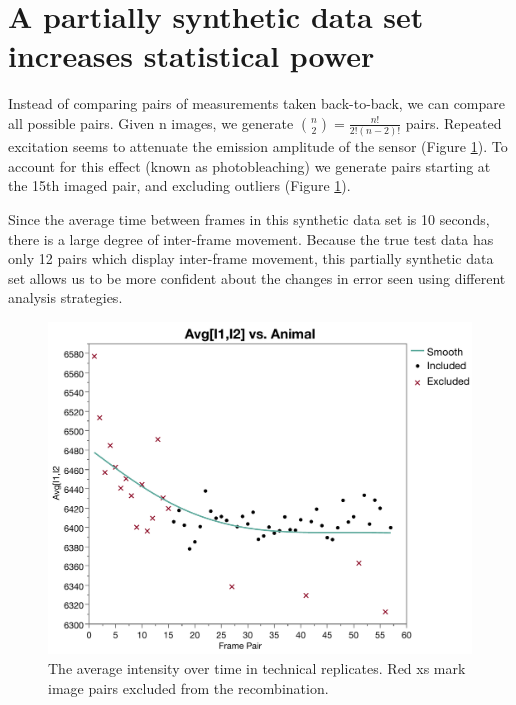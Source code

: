 \section{A partially synthetic data set increases statistical power}

Instead of comparing pairs of measurements taken back-to-back, we can compare all possible pairs. Given n images, we generate ${n \choose 2} = \frac{n!}{2!(n-2)!}$ pairs. Repeated excitation seems to attenuate the emission amplitude of the sensor (Figure \ref{fig:AvgIntensityOverTime}). To account for this effect (known as photobleaching) we generate pairs starting at the 15th imaged pair, and excluding outliers (Figure \ref{fig:AvgIntensityOverTime}).

Since the average time between frames in this synthetic data set is 10 seconds, there is a large degree of inter-frame movement. Because the true test data has only 12  pairs which display inter-frame movement, this partially synthetic data set allows us to be more confident about the changes in error seen using different analysis strategies.

\begin{figure}[ht]
    \centering
    \includegraphics[scale=0.35]{Figures/rendered_files/photobleaching}
    \decoRule
    \caption[Average intensity over time in technical replicates]{The average intensity over time in technical replicates. Red xs mark image pairs excluded from the recombination.}
    \label{fig:AvgIntensityOverTime}
\end{figure}

